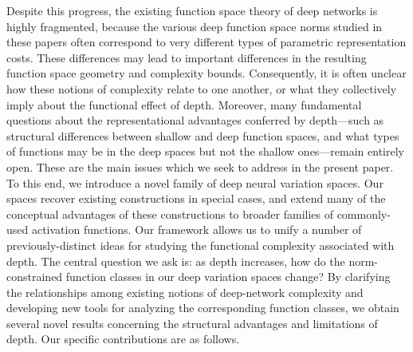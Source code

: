 \documentclass{article}
\begin{document}
Despite this progress, the existing function space theory of deep networks is highly fragmented, because the various deep function space norms studied in these papers often correspond to very different types of parametric representation costs. These differences may lead to important differences in the resulting function space geometry and complexity bounds. Consequently, it is often unclear how these notions of complexity relate to one another, or what they collectively imply about the functional effect of depth. Moreover, many fundamental questions about the representational advantages conferred by depth---such as structural differences between shallow and deep function spaces, and what types of functions may be in the deep spaces but not the shallow ones---remain entirely open. These are the main issues which we seek to address in the present paper. To this end, we introduce a novel family of deep neural variation spaces. Our spaces recover existing constructions in special cases, and extend many of the conceptual advantages of these constructions to broader families of commonly-used activation functions. Our framework allows us to unify a number of previously-distinct ideas for studying the functional complexity associated with depth. The central question we ask is: as depth increases, how do the norm-constrained function classes in our deep variation spaces change? By clarifying the relationships among existing notions of deep-network complexity and developing new tools for analyzing the corresponding function classes, we obtain several novel results concerning the structural advantages and limitations of depth. Our specific contributions are as follows.
\end{document}
